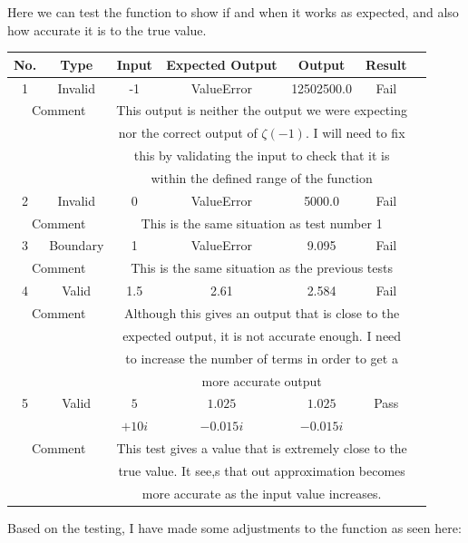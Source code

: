 \documentclass{article}
\begin{document}
Here we can test the function to show if and when it works as expected, and also how accurate it is to the true value.
\\
\begin{table}[ht]
    \centering
    \begin{tabular}{|c|c|c|c|c|c|c|}
    \hline
    \textbf{No.} & \textbf{Type} & \textbf{Input} & \textbf{Expected Output} & \textbf{Output} & \textbf{Result}\\
    \hline
    \hline
    1 & Invalid & -1 & ValueError & 12502500.0 & Fail\\
    \hline
    \multicolumn{2}{|c|}{Comment} & \multicolumn{4}{|c|}{This output is neither the output we were expecting}\\
    \multicolumn{2}{|c|}{} & \multicolumn{4}{|c|}{nor the correct output of $\zeta(-1)$. I will need to fix}\\
    \multicolumn{2}{|c|}{} & \multicolumn{4}{|c|}{this by validating the input to check that it is}\\
    \multicolumn{2}{|c|}{} & \multicolumn{4}{|c|}{within the defined range of the function}\\
    \hline
    \hline
    2 & Invalid & 0 & ValueError & 5000.0 & Fail\\
    \hline
    \multicolumn{2}{|c|}{Comment} & \multicolumn{4}{|c|}{This is the same situation as test number 1}\\
    \hline
    \hline
    3 & Boundary & 1 & ValueError & 9.095 & Fail\\
    \hline
    \multicolumn{2}{|c|}{Comment} & \multicolumn{4}{|c|}{This is the same situation as the previous tests}\\
    \hline
    \hline
    4 & Valid & 1.5 & 2.61 & 2.584 & Fail\\
    \hline
    \multicolumn{2}{|c|}{Comment} & \multicolumn{4}{|c|}{Although this gives an output that is close to the}\\
    \multicolumn{2}{|c|}{} & \multicolumn{4}{|c|}{expected output, it is not accurate enough. I need}\\
    \multicolumn{2}{|c|}{} & \multicolumn{4}{|c|}{to increase the number of terms in order to get a}\\
    \multicolumn{2}{|c|}{} & \multicolumn{4}{|c|}{more accurate output}\\
    \hline
    \hline
    5 & Valid & $5$ & $1.025$ & $1.025$ & Pass\\
      & & $+10i$ & $-0.015i$ & $-0.015i$  & \\
    \hline
    \multicolumn{2}{|c|}{Comment} & \multicolumn{4}{|c|}{This test gives a value that is extremely close to the}\\
    \multicolumn{2}{|c|}{} & \multicolumn{4}{|c|}{true value. It see,s that out approximation becomes}\\
    \multicolumn{2}{|c|}{} & \multicolumn{4}{|c|}{more accurate as the input value increases.}\\
    \hline
    \end{tabular}
\end{table}
\clearpage
Based on the testing, I have made some adjustments to the function as seen here:
\end{document}

